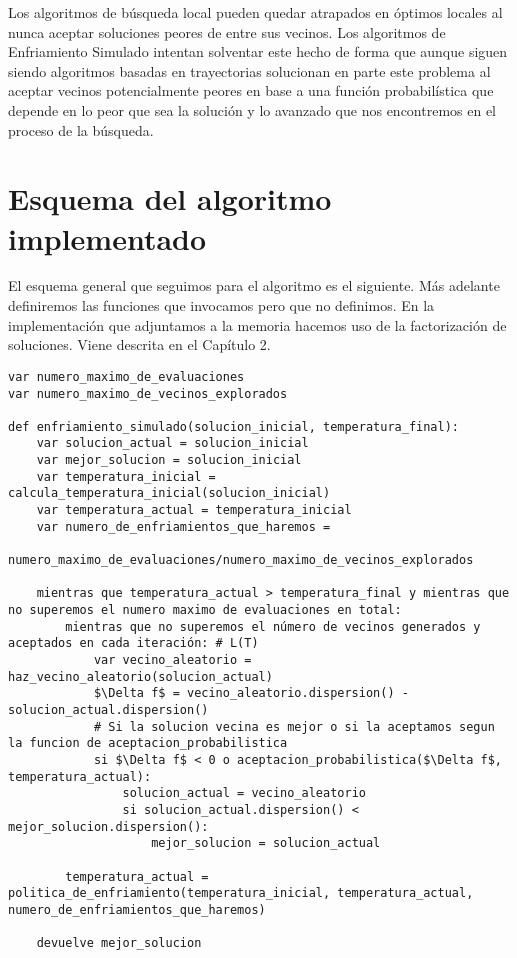 Los algoritmos de búsqueda local
pueden quedar atrapados en óptimos locales al nunca aceptar soluciones
peores de entre sus vecinos. Los algoritmos de Enfriamiento Simulado intentan
solventar este hecho de forma que aunque
siguen siendo algoritmos basadas en trayectorias solucionan en parte
este problema al aceptar vecinos potencialmente peores
en base a una función probabilística que depende en lo peor que sea la solución y
lo avanzado que nos encontremos en el proceso de la búsqueda.

\begin{minipage}{\textwidth}

	\section{Esquema del algoritmo implementado}

	El esquema general que seguimos para el algoritmo es el siguiente. Más adelante definiremos las
	funciones que invocamos pero que no definimos. En la implementación que adjuntamos a la memoria
	hacemos uso de la factorización de soluciones. Viene descrita en el Capítulo 2.

	\begin{lstlisting}[mathescape=true,caption={Esquema general de un algoritmo basado en el Enfriamiento Simulado.},captionpos=b]
var numero_maximo_de_evaluaciones
var numero_maximo_de_vecinos_explorados

def enfriamiento_simulado(solucion_inicial, temperatura_final):
	var solucion_actual = solucion_inicial
	var mejor_solucion = solucion_inicial
	var temperatura_inicial = calcula_temperatura_inicial(solucion_inicial)
	var temperatura_actual = temperatura_inicial
	var numero_de_enfriamientos_que_haremos =
		numero_maximo_de_evaluaciones/numero_maximo_de_vecinos_explorados

	mientras que temperatura_actual > temperatura_final y mientras que no superemos el numero maximo de evaluaciones en total:
		mientras que no superemos el número de vecinos generados y aceptados en cada iteración:	# L(T)
			var vecino_aleatorio = haz_vecino_aleatorio(solucion_actual)
			$\Delta f$ = vecino_aleatorio.dispersion() - solucion_actual.dispersion()
			# Si la solucion vecina es mejor o si la aceptamos segun la funcion de aceptacion_probabilistica
			si $\Delta f$ < 0 o aceptacion_probabilistica($\Delta f$, temperatura_actual):
				solucion_actual = vecino_aleatorio
				si solucion_actual.dispersion() < mejor_solucion.dispersion():
					mejor_solucion = solucion_actual
	
		temperatura_actual = politica_de_enfriamiento(temperatura_inicial, temperatura_actual, numero_de_enfriamientos_que_haremos)
	
	devuelve mejor_solucion
	\end{lstlisting}
\end{minipage}

